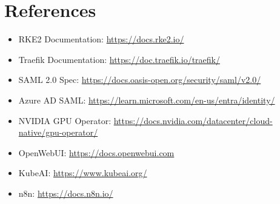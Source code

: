 \documentclass[11pt,a4paper]{article}
\begin{document}
\section{References}

\begin{itemize}
    \item RKE2 Documentation: \url{https://docs.rke2.io/}
    \item Traefik Documentation: \url{https://doc.traefik.io/traefik/}
    \item SAML 2.0 Spec: \url{https://docs.oasis-open.org/security/saml/v2.0/}
    \item Azure AD SAML: \url{https://learn.microsoft.com/en-us/entra/identity/}
    \item NVIDIA GPU Operator: \url{https://docs.nvidia.com/datacenter/cloud-native/gpu-operator/}
    \item OpenWebUI: \url{https://docs.openwebui.com}
    \item KubeAI: \url{https://www.kubeai.org/}
    \item n8n: \url{https://docs.n8n.io/}
\end{itemize}
\end{document}
